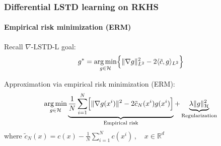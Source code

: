 \documentclass[xcolor=dvipsnames, subsection=false]{beamer}
\def\alertb#1{\alert{\color{BrickRed}  #1}}
\def\alertb#1{\alert{\color{BrickRed}  #1}}
\def\clH{{\mathcal H}}
\def\tilc{\tilde c}
\newcommand{\field}[1]{\mathbb{#1}}
\def\Re{\field{R}}
\def\varble{\,\cdot\,}
\def\argmin{\mathop{\rm arg\, min}}
\def\eqdef{\mathbin{:=}}
\def\gradTD{\nabla\text{-LSTD}}
\begin{document}
%	
%	
%	

\begin{frame}
\frametitle{Differential LSTD learning on RKHS}
\framesubtitle{Empirical risk minimization (ERM)}

\begin{minipage}[t][6.5cm][t]{\textwidth}
	
	Recall $\gradTD$-L goal:
	\[
	g^* = \argmin_{g\in \clH}   \Bigl\{   \|\nabla g  \|_{L^2}^2   -  2 \langle  \tilc,   g \rangle_{L^2}   \Bigr\}
	\]
	
	Approximation via \alertb{empirical risk minimization (ERM)}:
	\[
	\argmin_{g \in \clH} \underbrace{\frac{1}{N} \sum_{i=1}^N\Bigl[ \| \nabla g(x^i) \|^2 - 2 \tilc_N(x^i)g(x^i)\Bigr]}_{\text{Empirical risk}} + \underbrace{\lambda \|g\|_\clH^2}_{\text{Regularization}}
	\]
 where $\tilc_N(x) = c(x) - \frac{1}{N}  \sum_{i=1}^N  c(x^i)\,,\quad x\in\Re^d\, $
\end{minipage}
\end{frame}
\end{document}
